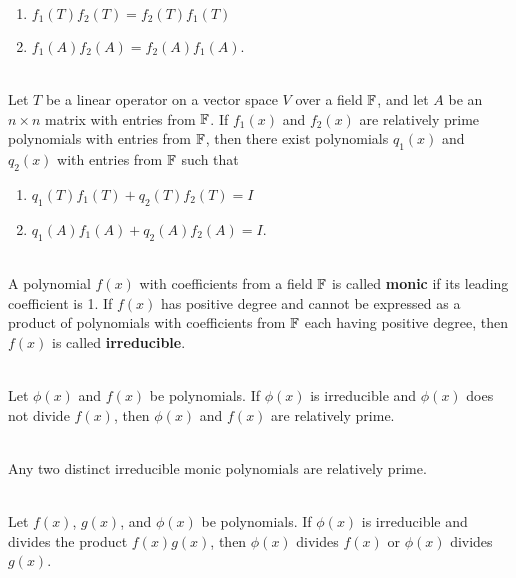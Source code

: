 \begin{alphasection}
\begin{theorem}
		\begin{enumerate}
			\item $f_1(T)f_2(T) = f_2(T)f_1(T)$
			\item $f_1(A)f_2(A) = f_2(A)f_1(A)$.
		\end{enumerate}
	\end{theorem}

	\begin{theorem}
		\hfill\\
		Let $T$ be a linear operator on a vector space $V$ over a field $\mathbb{F}$, and let $A$ be an $n \times n$ matrix with entries from $\mathbb{F}$. If $f_1(x)$ and $f_2(x)$ are relatively prime polynomials with entries from $\mathbb{F}$, then there exist polynomials $q_1(x)$ and $q_2(x)$ with entries from $\mathbb{F}$ such that

		\begin{enumerate}
			\item $q_1(T)f_1(T) + q_2(T)f_2(T) = I$
			\item $q_1(A)f_1(A) + q_2(A)f_2(A) = I$.
		\end{enumerate}
	\end{theorem}

	\begin{definition}
		\hfill\\
		A polynomial $f(x)$ with coefficients from a field $\mathbb{F}$ is called \textbf{monic} if its leading coefficient is 1. If $f(x)$ has positive degree and cannot be expressed as a product of polynomials with coefficients from $\mathbb{F}$ each having positive degree, then $f(x)$ is called \textbf{irreducible}.
	\end{definition}

	\begin{theorem}
		\hfill\\
		Let $\phi(x)$ and $f(x)$ be polynomials. If $\phi(x)$ is irreducible and $\phi(x)$ does not divide $f(x)$, then $\phi(x)$ and $f(x)$ are relatively prime.
	\end{theorem}

	\begin{theorem}
		\hfill\\
		Any two distinct irreducible monic polynomials are relatively prime.
	\end{theorem}

	\begin{theorem}
		\hfill\\
		Let $f(x)$, $g(x)$, and $\phi(x)$ be polynomials. If $\phi(x)$ is irreducible and divides the product $f(x)g(x)$, then $\phi(x)$ divides $f(x)$ or $\phi(x)$ divides $g(x)$.
	\end{theorem}


\end{alphasection}
